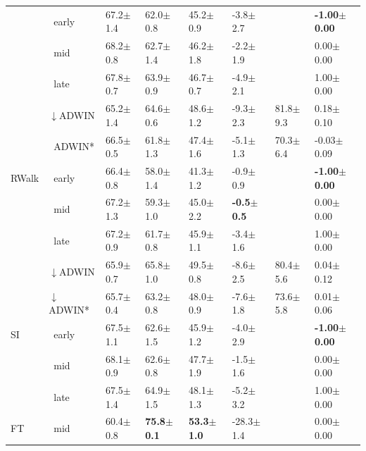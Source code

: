 \begin{tabular}{llllllll}
 & $\ \;$early & 67.2\tiny{$\pm$1.4} & 62.0\tiny{$\pm$0.8} & 45.2\tiny{$\pm$0.9} & -3.8\tiny{$\pm$2.7} &  & \textbf{-1.00\tiny{$\pm$0.00}} \\
 & $\ \;$mid & 68.2\tiny{$\pm$0.8} & 62.7\tiny{$\pm$1.4} & 46.2\tiny{$\pm$1.8} & -2.2\tiny{$\pm$1.9} &  & 0.00\tiny{$\pm$0.00} \\
 & $\ \;$late & 67.8\tiny{$\pm$0.7} & 63.9\tiny{$\pm$0.9} & 46.7\tiny{$\pm$0.7} & -4.9\tiny{$\pm$2.1} &  & 1.00\tiny{$\pm$0.00} \\
\midrule
\multirow[t]{5}{*}{RWalk} & $\downarrow$ADWIN & 65.2\tiny{$\pm$1.4} & 64.6\tiny{$\pm$0.6} & 48.6\tiny{$\pm$1.2} & -9.3\tiny{$\pm$2.3} & 81.8\tiny{$\pm$9.3} & 0.18\tiny{$\pm$0.10} \\
 & $\ \;$ADWIN* & 66.5\tiny{$\pm$0.5} & 61.8\tiny{$\pm$1.3} & 47.4\tiny{$\pm$1.6} & -5.1\tiny{$\pm$1.3} & 70.3\tiny{$\pm$6.4} & -0.03\tiny{$\pm$0.09} \\
 & $\ \;$early & 66.4\tiny{$\pm$0.8} & 58.0\tiny{$\pm$1.4} & 41.3\tiny{$\pm$1.2} & -0.9\tiny{$\pm$0.9} &  & \textbf{-1.00\tiny{$\pm$0.00}} \\
 & $\ \;$mid & 67.2\tiny{$\pm$1.3} & 59.3\tiny{$\pm$1.0} & 45.0\tiny{$\pm$2.2} & \textbf{-0.5\tiny{$\pm$0.5}} &  & 0.00\tiny{$\pm$0.00} \\
 & $\ \;$late & 67.2\tiny{$\pm$0.9} & 61.7\tiny{$\pm$0.8} & 45.9\tiny{$\pm$1.1} & -3.4\tiny{$\pm$1.6} &  & 1.00\tiny{$\pm$0.00} \\
\midrule
\multirow[t]{5}{*}{SI} & $\downarrow$ADWIN & 65.9\tiny{$\pm$0.7} & 65.8\tiny{$\pm$1.0} & 49.5\tiny{$\pm$0.8} & -8.6\tiny{$\pm$2.5} & 80.4\tiny{$\pm$5.6} & 0.04\tiny{$\pm$0.12} \\
 & $\downarrow$ADWIN* & 65.7\tiny{$\pm$0.4} & 63.2\tiny{$\pm$0.8} & 48.0\tiny{$\pm$0.9} & -7.6\tiny{$\pm$1.8} & 73.6\tiny{$\pm$5.8} & 0.01\tiny{$\pm$0.06} \\
 & $\ \;$early & 67.5\tiny{$\pm$1.1} & 62.6\tiny{$\pm$1.5} & 45.9\tiny{$\pm$1.2} & -4.0\tiny{$\pm$2.9} &  & \textbf{-1.00\tiny{$\pm$0.00}} \\
 & $\ \;$mid & 68.1\tiny{$\pm$0.9} & 62.6\tiny{$\pm$0.8} & 47.7\tiny{$\pm$1.9} & -1.5\tiny{$\pm$1.6} &  & 0.00\tiny{$\pm$0.00} \\
 & $\ \;$late & 67.5\tiny{$\pm$1.4} & 64.9\tiny{$\pm$1.5} & 48.1\tiny{$\pm$1.3} & -5.2\tiny{$\pm$3.2} &  & 1.00\tiny{$\pm$0.00} \\
\midrule
FT & $\ \;$mid & 60.4\tiny{$\pm$0.8} & \textbf{75.8\tiny{$\pm$0.1}} & \textbf{53.3\tiny{$\pm$1.0}} & -28.3\tiny{$\pm$1.4} &  & 0.00\tiny{$\pm$0.00} \\
\bottomrule
\end{tabular}

